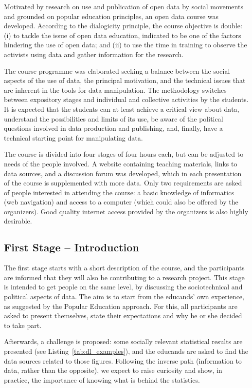 \label{dl_method} 

Motivated by research on use and publication of open data by social movements and grounded on popular education principles, an open data course was developed. According to the dialogicity principle, the course objective is double: (i) to tackle the issue of open data education, indicated to be one of the factors hindering the use of open data; and (ii) to use the time in training to observe the activists using data and gather information for the research.

The course programme was elaborated seeking a balance between the social aspects of the use of data, the principal motivation, and the technical issues that are inherent in the tools for data manipulation. The methodology switches between expository stages and individual and collective activities by the students. It is expected that the students can at least achieve a critical view about data, understand the possibilities and limits of its use, be aware of the political questions involved in data production and publishing, and, finally, have a technical starting point for manipulating data.

The course is divided into four stages of four hours each, but can be adjusted to needs of the people involved. A website containing teaching materials, links to data sources, and a discussion forum was developed, which in each presentation of the course is supplemented with more data.
Only two requirements are asked of people interested in attending the course: a basic knowledge of informatics (web navigation) and access to a computer (which could also be offered by the organizers). Good quality internet access provided by the organizers is also highly desirable.

\subsection{First Stage – Introduction}

The first stage starts with a short description of the course, and the participants are informed that they will also be contributing to a research project. This stage is intended to get people on the same level, by discussing the sociotechnical and political aspects of data. The aim is to start from the educands' own experience, as suggested by the Popular Education approach. For this, all participants are asked to present themselves, state their expectations and why he or she decided to take part.

Afterwards, a challenge is proposed: some socially relevant statistical results are presented (see Listing~\ref{tab:dl_examples}), and the educands are asked to find the data sources related to those figures. Following the inverse path (information to data, rather than the opposite), we expect to raise curiosity and show, in practice, the importance of knowing what is behind the statistics.

